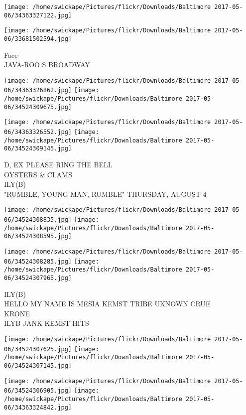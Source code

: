 \documentclass[10pt,letterpaper]{article}
\begin{document}
\texttt{[image: /home/swickape/Pictures/flickr/Downloads/Baltimore 2017-05-06/34363327122.jpg]}

\vspace{0.25in}
\texttt{[image: /home/swickape/Pictures/flickr/Downloads/Baltimore 2017-05-06/33681502594.jpg]}

Face\\
JAVA{-}ROO S BROADWAY\\
\pagebreak

\texttt{[image: /home/swickape/Pictures/flickr/Downloads/Baltimore 2017-05-06/34363326862.jpg]}
\texttt{[image: /home/swickape/Pictures/flickr/Downloads/Baltimore 2017-05-06/34524309675.jpg]}

\texttt{[image: /home/swickape/Pictures/flickr/Downloads/Baltimore 2017-05-06/34363326552.jpg]}
\texttt{[image: /home/swickape/Pictures/flickr/Downloads/Baltimore 2017-05-06/34524309145.jpg]}

D, EX PLEASE RING THE BELL\\
OYSTERS \& CLAMS\\
ILY(B)\\
"RUMBLE, YOUNG MAN, RUMBLE" THURSDAY, AUGUST 4\\
\pagebreak

\texttt{[image: /home/swickape/Pictures/flickr/Downloads/Baltimore 2017-05-06/34524308835.jpg]}
\texttt{[image: /home/swickape/Pictures/flickr/Downloads/Baltimore 2017-05-06/34524308595.jpg]}

\texttt{[image: /home/swickape/Pictures/flickr/Downloads/Baltimore 2017-05-06/34524308285.jpg]}
\texttt{[image: /home/swickape/Pictures/flickr/Downloads/Baltimore 2017-05-06/34524307965.jpg]}

ILY(B)\\
HELLO MY NAME IS MESIA KEMST TRIBE UKNOWN CRUE\\
KRONE\\
ILYB JANK KEMST HITS\\
\pagebreak

\texttt{[image: /home/swickape/Pictures/flickr/Downloads/Baltimore 2017-05-06/34524307625.jpg]}
\texttt{[image: /home/swickape/Pictures/flickr/Downloads/Baltimore 2017-05-06/34524307145.jpg]}

\texttt{[image: /home/swickape/Pictures/flickr/Downloads/Baltimore 2017-05-06/34524306905.jpg]}
\texttt{[image: /home/swickape/Pictures/flickr/Downloads/Baltimore 2017-05-06/34363324842.jpg]}
\end{document}
